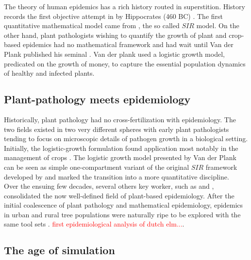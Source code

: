 The theory of human epidemics has a rich history routed in superstition. History records the first objective attempt in by Hippocrates (460  BC) \cite{langholf2011medical}. The first quantitative mathematical model came from \cite{kermack-model}, the so called $SIR$ model. On the other hand, plant pathologists wishing to quantify the growth of plant and crop-based epidemics had no mathematical framework and had wait until Van der Plank published his seminal \cite{van2013plant}. Van der plank used a logistic growth model, predicated on the growth of money, to capture the essential population dynamics of healthy and infected plants.\\

\subsection{Plant-pathology meets epidemiology}
Historically, plant pathology had no cross-fertilization with epidemiology. The two fields existed in two very different spheres with early plant pathologists tending to focus on microscopic details of pathogen growth in a biological setting. Initially, the logistic-growth formulation found application most notably in the management of crops \cite{browning1969multiline}. The logistic growth model presented by Van der Plank can be seen as simple one-compartment variant of the original $SIR$ framework developed by \cite{kermack-model} and marked the transition into a more quantitative discipline.\\

Over the ensuing few decades, several others key worker, such as \cite{zadoks1979epidemiology} and \cite{campbell1990introduction}, consolidated the now well-defined field of plant-based epidemiology. 
After the initial coalescence of plant pathology and mathematical epidemiology, epidemics in urban and rural tree populations were naturally ripe to be explored with the same tool sets \cite{manion1981tree}. \textcolor{red}{first epidemiological analysis of dutch elm...}.

\subsection{The age of simulation}

